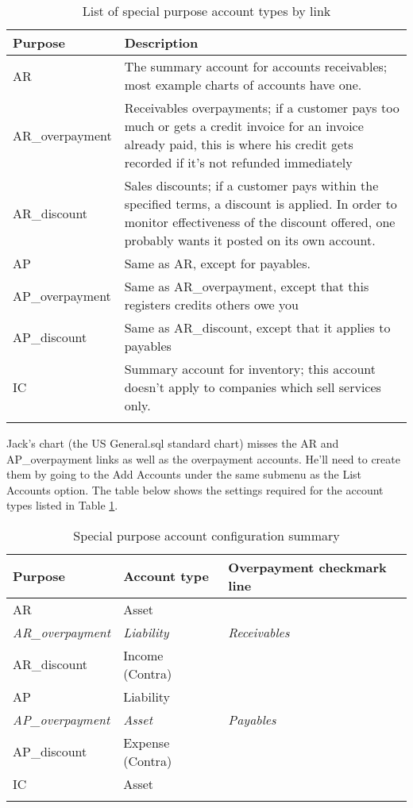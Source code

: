 \begin{longtable}{ lp{8cm} }
Purpose & Description \\ \hline
\endhead
AR  & The summary account for accounts receivables; most example charts of accounts have one. \\
AR\_overpayment & Receivables overpayments; if a customer pays too much or gets a credit
                  invoice for an invoice already paid, this is where his credit gets
                  recorded if it's not refunded immediately \\
AR\_discount & Sales discounts; if a customer pays within the specified terms, a discount
                  is applied.
                  In order to monitor effectiveness of the discount offered, one probably
                  wants it posted on its own account. \\
AP  & Same as AR, except for payables. \\
AP\_overpayment  & Same as AR\_overpayment, except that this registers credits others owe you \\
AP\_discount &  Same as AR\_discount, except that it applies to payables \\
IC  & Summary account for inventory; this account doesn't apply to companies which sell
      services only. \\

\caption{List of special purpose account types by link}
\label{tbl:special-purpose-account-types-links}
\end{longtable}


Jack's chart (the US General.sql standard chart) misses the AR and AP\_overpayment links as
well as the overpayment accounts. He'll need to create them by going to the Add Accounts under
the same submenu as the List Accounts option. The table below shows the settings required for
the account types listed in Table \ref{tbl:special-purpose-account-types-links}.

\begin{longtable}{lll}
Purpose & Account type & Overpayment checkmark line \\ \hline
\endhead
AR & Asset &  \\
\textit{AR\_overpayment} & \textit{Liability} & \textit{Receivables} \\
AR\_discount & Income (Contra) &  \\
AP & Liability &  \\
\textit{AP\_overpayment} & \textit{Asset} & \textit{Payables} \\
AP\_discount & Expense (Contra) & \\
IC & Asset &  \\
\caption{Special purpose account configuration summary}
\label{tbl:special-purpose-account-config-summary}
\end{longtable}

